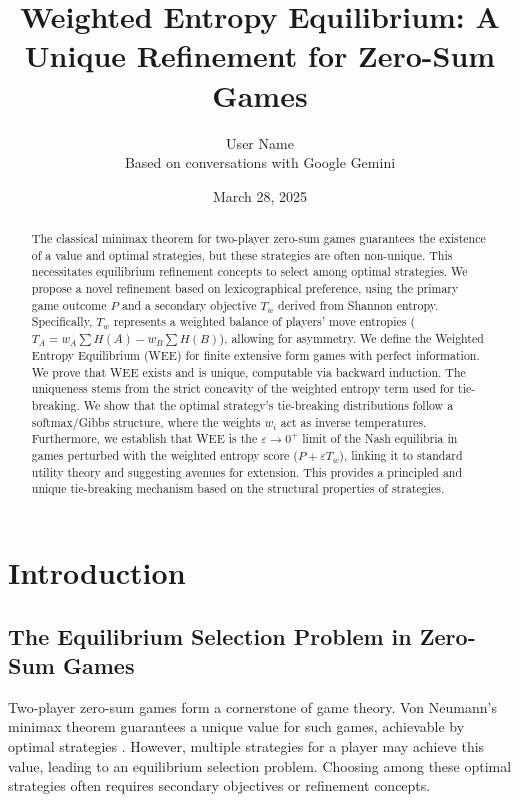 \documentclass{article}
\title{Weighted Entropy Equilibrium: A Unique Refinement for Zero-Sum Games}
\author{User Name \\ {\small Based on conversations with Google Gemini}} %
\date{March 28, 2025}
\begin{document}
\maketitle

\begin{abstract}
The classical minimax theorem for two-player zero-sum games guarantees the existence of a value and optimal strategies, but these strategies are often non-unique. This necessitates equilibrium refinement concepts to select among optimal strategies. We propose a novel refinement based on lexicographical preference, using the primary game outcome $P$ and a secondary objective $T_w$ derived from Shannon entropy. Specifically, $T_w$ represents a weighted balance of players' move entropies ($T_A = w_A \sum H(A) - w_B \sum H(B)$), allowing for asymmetry. We define the Weighted Entropy Equilibrium (WEE) for finite extensive form games with perfect information. We prove that WEE exists and is unique, computable via backward induction. The uniqueness stems from the strict concavity of the weighted entropy term used for tie-breaking. We show that the optimal strategy's tie-breaking distributions follow a softmax/Gibbs structure, where the weights $w_i$ act as inverse temperatures. Furthermore, we establish that WEE is the $\varepsilon \to 0^+$ limit of the Nash equilibria in games perturbed with the weighted entropy score ($P + \varepsilon T_w$), linking it to standard utility theory and suggesting avenues for extension. This provides a principled and unique tie-breaking mechanism based on the structural properties of strategies.
\end{abstract}

\section{Introduction}

\subsection{The Equilibrium Selection Problem in Zero-Sum Games}
Two-player zero-sum games form a cornerstone of game theory. Von Neumann's minimax theorem guarantees a unique value for such games, achievable by optimal strategies \cite{placeholder_vonneumann}. However, multiple strategies for a player may achieve this value, leading to an equilibrium selection problem. Choosing among these optimal strategies often requires secondary objectives or refinement concepts.
\end{document}
